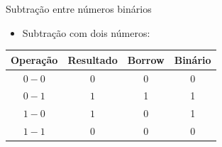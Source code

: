 
\begin{frame}{Subtração entre números binários}
    \begin{itemize}
        \item Subtração com dois números:
    \end{itemize}
    \begin{table}[h]
        \centering
        \begin{tabular}{c|c|c|c}
            \hline
            \textbf{Operação} & \textbf{Resultado} & \textbf{Borrow} & \textbf{Binário} \\
            \hline
            $0 - 0$         & $0$    & 0        & 0     \\
            $0 - 1$         & $1$    & 1        & 1     \\
            $1 - 0$         & $1$    & 0        & 1     \\
            $1 - 1$         & $0$    & 0        & 0     \\
            \hline
        \end{tabular}
    \end{table}
\end{frame}